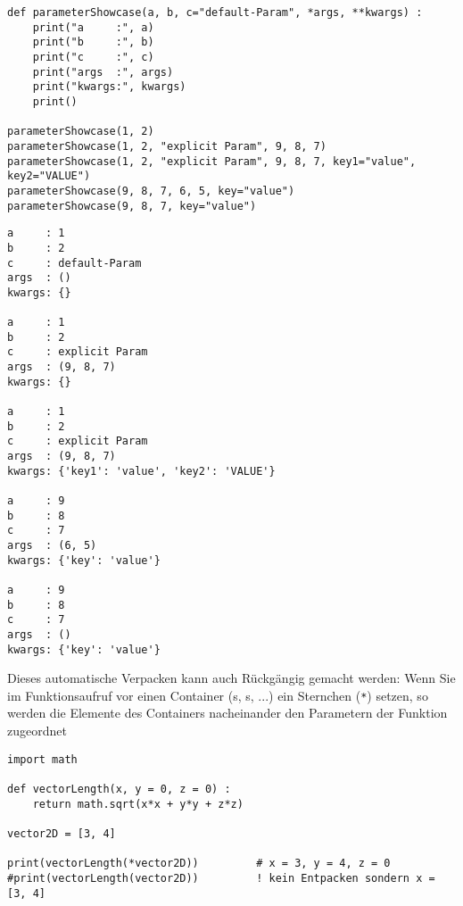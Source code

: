 \begin{codebox}
\begin{verbatim}
def parameterShowcase(a, b, c="default-Param", *args, **kwargs) :
    print("a     :", a)
    print("b     :", b)
    print("c     :", c)
    print("args  :", args)
    print("kwargs:", kwargs)
    print()

parameterShowcase(1, 2)
parameterShowcase(1, 2, "explicit Param", 9, 8, 7)
parameterShowcase(1, 2, "explicit Param", 9, 8, 7, key1="value", key2="VALUE")
parameterShowcase(9, 8, 7, 6, 5, key="value")
parameterShowcase(9, 8, 7, key="value")
\end{verbatim}
\end{codebox}
\begin{cmdbox}
\begin{verbatim}
a     : 1
b     : 2
c     : default-Param
args  : ()
kwargs: {}

a     : 1
b     : 2
c     : explicit Param
args  : (9, 8, 7)
kwargs: {}

a     : 1
b     : 2
c     : explicit Param
args  : (9, 8, 7)
kwargs: {'key1': 'value', 'key2': 'VALUE'}

a     : 9
b     : 8
c     : 7
args  : (6, 5)
kwargs: {'key': 'value'}

a     : 9
b     : 8
c     : 7
args  : ()
kwargs: {'key': 'value'}
\end{verbatim}
\end{cmdbox}


Dieses automatische Verpacken kann auch Rückgängig gemacht werden: Wenn Sie im Funktionsaufruf vor einen Container (s, s, ...) ein Sternchen (\texttt{*}) setzen, so werden die Elemente des Containers nacheinander den Parametern der Funktion zugeordnet

\begin{codebox}
\begin{verbatim}
import math

def vectorLength(x, y = 0, z = 0) :
    return math.sqrt(x*x + y*y + z*z)

vector2D = [3, 4]

print(vectorLength(*vector2D))         # x = 3, y = 4, z = 0
#print(vectorLength(vector2D))         ! kein Entpacken sondern x = [3, 4]
\end{verbatim}
\end{codebox}

